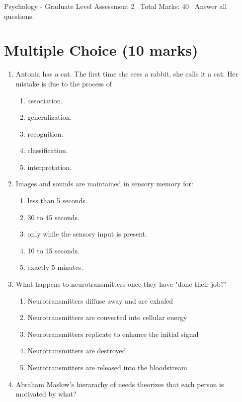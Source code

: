 \documentclass[12pt]{article}
\begin{document}
\begin{center}
Psychology - Graduate Level Assessment 2 \
Total Marks: 40 \
Answer all questions.
\end{center}

\section*{Multiple Choice (10 marks)}
\begin{enumerate}[label=\arabic*.]
\item Antonia has a cat. The first time she sees a rabbit, she calls it a cat. Her mistake is due to the process of
\begin{enumerate}[label=(\alph*)]
    \item association.
    \item generalization.
    \item recognition.
    \item classification.
    \item interpretation.
\end{enumerate}
\item Images and sounds are maintained in sensory memory for:
\begin{enumerate}[label=(\alph*)]
    \item less than 5 seconds.
    \item 30 to 45 seconds.
    \item only while the sensory input is present.
    \item 10 to 15 seconds.
    \item exactly 5 minutes.
\end{enumerate}
\item What happens to neurotransmitters once they have "done their job?"
\begin{enumerate}[label=(\alph*)]
    \item Neurotransmitters diffuse away and are exhaled
    \item Neurotransmitters are converted into cellular energy
    \item Neurotransmitters replicate to enhance the initial signal
    \item Neurotransmitters are destroyed
    \item Neurotransmitters are released into the bloodstream
\end{enumerate}
\item Abraham Maslow's hierarachy of needs theorizes that each person is motivated by what?
\begin{enumerate}[label=(\alph*)]

\end{enumerate}
\end{enumerate}
\end{document}
